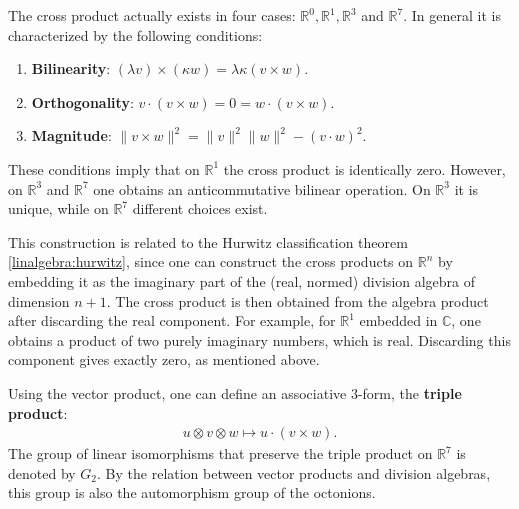     \begin{remark}
        The cross product actually exists in four cases: $\mathbb{R}^0,\mathbb{R}^1,\mathbb{R}^3$ and $\mathbb{R}^7$. In general it is characterized by the following conditions:
        \begin{enumerate}
            \item\textbf{Bilinearity}: $(\lambda v)\times(\kappa w) = \lambda\kappa(v\times w)$.
            \item\textbf{Orthogonality}: $v\cdot(v\times w)=0=w\cdot(v\times w)$.
            \item\textbf{Magnitude}: $\|v\times w\|^2 = \|v\|^2\|w\|^2 - (v\cdot w)^2$.
        \end{enumerate}
        These conditions imply that on $\mathbb{R}^1$ the cross product is identically zero. However, on $\mathbb{R}^3$ and $\mathbb{R}^7$ one obtains an anticommutative bilinear operation. On $\mathbb{R}^3$ it is unique, while on $\mathbb{R}^7$ different choices exist.

        This construction is related to the Hurwitz classification theorem \ref{linalgebra:hurwitz}, since one can construct the cross products on $\mathbb{R}^n$ by embedding it as the imaginary part of the (real, normed) division algebra of dimension $n+1$. The cross product is then obtained from the algebra product after discarding the real component. For example, for $\mathbb{R}^1$ embedded in  $\mathbb{C}$, one obtains a product of two purely imaginary numbers, which is real. Discarding this component gives exactly zero, as mentioned above.
    \end{remark}

    \begin{property}
        Using the vector product, one can define an associative 3-form, the \textbf{triple product}:
        \begin{gather}
            u\otimes v\otimes w\mapsto u\cdot(v\times w).
        \end{gather}
        The group of linear isomorphisms that preserve the triple product on $\mathbb{R}^7$ is denoted by $G_2$. By the relation between vector products and division algebras, this group is also the automorphism group of the octonions.
    \end{property}


